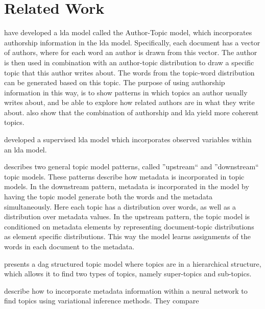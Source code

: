 \section{Related Work}

\citet{author_topic_2012} have developed a \gls{lda} model called the Author-Topic model, which incorporates authorship information in the \gls{lda} model.
Specifically, each document has a vector of authors, where for each word an author is drawn from this vector.
The author is then used in combination with an author-topic distribution to draw a specific topic that this author writes about.
The words from the topic-word distribution can be generated based on this topic.
The purpose of using authorship information in this way, is to show patterns in which topics an author usually writes about, and be able to explore how related authors are in what they write about.
\citeauthor{author_topic_2012} also show that the combination of authorship and \gls{lda} yield more coherent topics.

\citet{blei2010supervised} developed a supervised \gls{lda} model which incorporates observed variables within an \gls{lda} model.


\citet{mimno2008topic} describes two general topic model patterns, called ''upstream`` and ''downstream`` topic models.
These patterns describe how metadata is incorporated in topic models.
In the downstream pattern, metadata is incorporated in the model by having the topic model generate both the words and the metadata simultaneously.
Here each topic has a distribution over words, as well as a distribution over metadata values.
In the upstream pattern, the topic model is conditioned on metadata elements by representing document-topic distributions as element specific distributions.
This way the model learns assignments of the words in each document to the metadata.

\citet{li2006pachinko} presents a \gls{dag} structured topic model where topics are in a hierarchical structure, which allows it to find two types of topics, namely super-topics and sub-topics. 


\citet{card2017neural} describe how to incorporate metadata information within a neural network to find topics using variational inference methods.
They compare 

